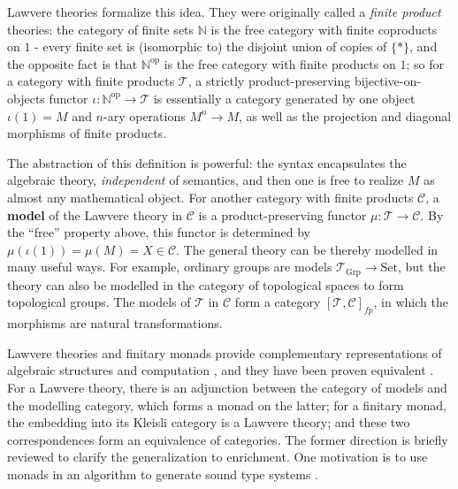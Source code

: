 \documentclass[a4paper,UKenglish]{article}
\theoremstyle{definition}
\newcommand{\Set}{\mathrm{Set}}
\newcommand{\Grp}{\mathrm{Grp}}
\newcommand{\op}{\mathrm{op}}
\newcommand{\NN}{\mathbb{N}}
\newcommand{\C}{\mathscr{C}}
\newcommand{\T}{\mathscr{T}}
\begin{document}
Lawvere theories formalize this idea. They were originally called a \textit{finite product} theories: the category of finite sets $\NN$ is the free category with finite coproducts on $1$ - every finite set is (isomorphic to) the disjoint union of copies of $\{*\}$, and the opposite fact is that $\NN^\op$ is the free category with finite products on $1$; so for a category with finite products $\T$, a strictly product-preserving bijective-on-objects functor $\iota:\NN^\op \to \T$ is essentially a category generated by one object $\iota(1) = M$ and $n$-ary operations $M^n \to M$, as well as the projection and diagonal morphisms of finite products.

The abstraction of this definition is powerful: the syntax encapsulates the algebraic theory, \textit{independent} of semantics, and then one is free to realize $M$ as almost any mathematical object. For another category with finite products $\C$, a \textbf{model} of the Lawvere theory in $\C$ is a product-preserving functor $\mu: \T \to \C$. By the ``free'' property above, this functor is determined by $\mu(\iota(1)) = \mu(M) = X \in \C$. The general theory can be thereby modelled in many useful ways. For example, ordinary groups are models $\T_\Grp \to \Set$, but the theory can also be modelled in the category of topological spaces to form topological groups. The models of $\T$ in $\C$ form a category $[\T,\C]_{fp}$, in which the morphisms are natural transformations. 

Lawvere theories and finitary monads provide complementary representations of algebraic structures and computation \cite{ltam}, and they have been proven equivalent \cite{linton}. For a Lawvere theory, there is an adjunction between the category of models and the modelling category, which forms a monad on the latter; for a finitary monad, the embedding into its Kleisli category is a Lawvere theory; and these two correspondences form an equivalence of categories. The former direction is briefly reviewed to clarify the generalization to enrichment. One motivation is to use monads in an algorithm to generate sound type systems \cite{ladl}.
\end{document}
